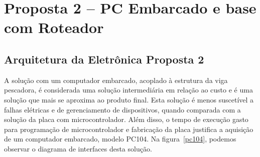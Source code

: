 


\section{Proposta 2 – PC Embarcado e base com Roteador}

\subsection{Arquitetura da Eletrônica Proposta 2}
A solução com um computador embarcado, acoplado à estrutura da viga pescadora, é
considerada uma solução intermediária em relação ao custo e é uma solução que
mais se aproxima ao produto final. Esta solução é menos suscetível a falhas
elétricas e de gerenciamento de dispositivos, quando comparada com a solução da
placa com microcontrolador. Além disso, o tempo de execução gasto para
programação de microcontrolador e fabricação da placa justifica a aquisição de
um computador embarcado, modelo PC104. Na figura~\ref{pc104}, podemos observar o
diagrama de interfaces desta solução.

